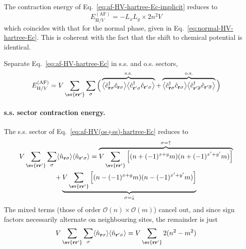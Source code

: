The contraction energy of Eq.~\eqref{eq:af-HV-hartree-Ec-implicit} reduces to
\begin{equation}\label{eq:af-HV-hartree-Ec}
	E_{\mathrm{H}/V}^{(\mathrm{AF})} = - L_x L_y \times 2n^2 V
\end{equation}
which coincides with that for the normal phase, given in Eq.~\eqref{eq:normal-HV-hartree-Ec}. This is coherent with the fact that the shift to chemical potential is identical.

\begin{tabproof}

	Separate Eq.~\eqref{eq:af-HV-hartree-Ec} in s.s. and o.s. sectors,
	\begin{equation}\label{eq:af-HV(os+ss)-hartree-Ec}
		E_{\mathrm{H}/V}^{(\mathrm{AF})} = V \sum_{\ev{\mathbf{r}\mathbf{r}'}} \sum_{\sigma} \Big(
			\overbrace{
				\big\langle \hat c_{\mathbf{r}\sigma}^\dagger \hat c_{\mathbf{r}\sigma} \big\rangle  \big\langle \hat c_{\mathbf{r}'\sigma}^\dagger \hat c_{\mathbf{r}'\sigma} \big\rangle
			}^\mathrm{s.s.} + \overbrace{
				\big\langle \hat c_{\mathbf{r}\sigma}^\dagger \hat c_{\mathbf{r}\sigma} \big\rangle  \big\langle \hat c_{\mathbf{r}'\overline{\sigma}}^\dagger \hat c_{\mathbf{r}'\overline{\sigma}} \big\rangle
			}^\mathrm{o.s.}
		\Big)
	\end{equation}
	
	\paragraph{s.s. sector contraction energy.}
	
	The s.s. sector of Eq.~\eqref{eq:af-HV(os+ss)-hartree-Ec} reduces to
	\begin{multline*}
		V \sum_{\ev{\mathbf{r}\mathbf{r}'}} \sum_\sigma \langle
		\hat n_{\mathbf{r}\sigma}
		\rangle \langle
		\hat n_{\mathbf{r}'\sigma}
		\rangle = \overbrace{
			V \sum_{\ev{\mathbf{r}\mathbf{r}'}} \left[
			(
			n + (-1)^{x+y} m
			) (
			n + (-1)^{x'+y'} m
			)
			\right]
		}^{\sigma=\uparrow} \\
		+ \underbrace{
			V \sum_{\ev{\mathbf{r}\mathbf{r}'}} \left[
			(
			n - (-1)^{x+y} m
			) (
			n - (-1)^{x'+y'} m
			)
			\right]
		}_{\sigma=\downarrow}
	\end{multline*}
	The mixed terms (those of order $\mathcal{O}(n)\times\mathcal{O}(m)$) cancel out, and since sign factors necessarily alternate on neighbouring sites, the remainder is just
	\begin{equation}\label{eq:af-HV(ss)-hartree-Ec}
		V \sum_{\ev{\mathbf{r}\mathbf{r}'}} \sum_\sigma \langle
		\hat n_{\mathbf{r}\sigma}
		\rangle \langle
		\hat n_{\mathbf{r}'\sigma}
		\rangle = V \sum_{\ev{\mathbf{r}\mathbf{r}'}} 2(
		n^2-m^2
		)
	\end{equation}
	

\end{tabproof}
